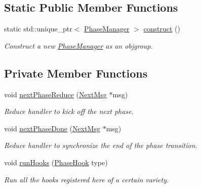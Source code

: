 \subsection*{Static Public Member Functions}
\begin{DoxyCompactItemize}
\item 
static std\+::unique\+\_\+ptr$<$ \hyperlink{structvt_1_1phase_1_1_phase_manager}{Phase\+Manager} $>$ \hyperlink{structvt_1_1phase_1_1_phase_manager_a6d864be02daa1cc0ec0b336aa1ebc31e}{construct} ()
\begin{DoxyCompactList}\small\item\em Construct a new {\ttfamily \hyperlink{structvt_1_1phase_1_1_phase_manager}{Phase\+Manager}} as an objgroup. \end{DoxyCompactList}\end{DoxyCompactItemize}
\subsection*{Private Member Functions}
\begin{DoxyCompactItemize}
\item 
void \hyperlink{structvt_1_1phase_1_1_phase_manager_a59345a6496fb1413de1a1899fe4532cf}{next\+Phase\+Reduce} (\hyperlink{structvt_1_1phase_1_1_next_msg}{Next\+Msg} $\ast$msg)
\begin{DoxyCompactList}\small\item\em Reduce handler to kick off the next phase. \end{DoxyCompactList}\item 
void \hyperlink{structvt_1_1phase_1_1_phase_manager_aa8db0caf0fcef7fe3ead90de2adda963}{next\+Phase\+Done} (\hyperlink{structvt_1_1phase_1_1_next_msg}{Next\+Msg} $\ast$msg)
\begin{DoxyCompactList}\small\item\em Reduce handler to synchronize the end of the phase transition. \end{DoxyCompactList}\item 
void \hyperlink{structvt_1_1phase_1_1_phase_manager_aeeb5b14ac179b2400a52914208bbd922}{run\+Hooks} (\hyperlink{namespacevt_1_1phase_aec9a63fdd99680d7a7fe99d321193811}{Phase\+Hook} type)
\begin{DoxyCompactList}\small\item\em Run all the hooks registered here of a certain variety. \end{DoxyCompactList}\end{DoxyCompactItemize}
